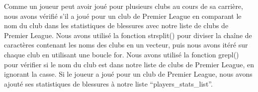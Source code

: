 \documentclass[
]{article}
\newenvironment{Shaded}{\begin{snugshade}}{\end{snugshade}}
\newcommand{\AttributeTok}[1]{\textcolor[rgb]{0.13,0.29,0.53}{#1}}
\newcommand{\ConstantTok}[1]{\textcolor[rgb]{0.56,0.35,0.01}{#1}}
\newcommand{\ControlFlowTok}[1]{\textcolor[rgb]{0.13,0.29,0.53}{\textbf{#1}}}
\newcommand{\DecValTok}[1]{\textcolor[rgb]{0.00,0.00,0.81}{#1}}
\newcommand{\FunctionTok}[1]{\textcolor[rgb]{0.13,0.29,0.53}{\textbf{#1}}}
\newcommand{\NormalTok}[1]{#1}
\newcommand{\OtherTok}[1]{\textcolor[rgb]{0.56,0.35,0.01}{#1}}
\newcommand{\SpecialCharTok}[1]{\textcolor[rgb]{0.81,0.36,0.00}{\textbf{#1}}}
\newcommand{\StringTok}[1]{\textcolor[rgb]{0.31,0.60,0.02}{#1}}
\begin{document}
\begin{Shaded}
\end{Shaded}

Comme un joueur peut avoir joué pour plusieurs clubs au cours de sa
carrière, nous avons vérifié s'il a joué pour un club de Premier League
en comparant le nom du club dans les statistiques de blessures avec
notre liste de clubs de Premier League. Nous avons utilisé la fonction
strsplit() pour diviser la chaîne de caractères contenant les noms des
clubs en un vecteur, puis nous avons itéré sur chaque club en utilisant
une boucle for. Nous avons utilisé la fonction grepl() pour vérifier si
le nom du club est dans notre liste de clubs de Premier League, en
ignorant la casse. Si le joueur a joué pour un club de Premier League,
nous avons ajouté ses statistiques de blessures à notre liste
``players\_stats\_list''.
\end{document}
